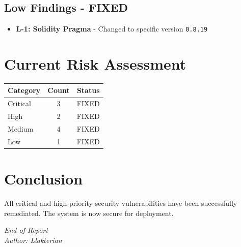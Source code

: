 \documentclass[12pt,a4paper]{article}
\begin{document}
\subsection{Low Findings - FIXED}

\begin{itemize}
\item \textbf{L-1: Solidity Pragma} - Changed to specific version \texttt{0.8.19}
\end{itemize}

\section{Current Risk Assessment}

\begin{tabular}{|l|c|c|}
\hline
Category & Count & Status \\
\hline
Critical & 3 & FIXED \\
\hline
High & 2 & FIXED \\
\hline
Medium & 4 & FIXED \\
\hline
Low & 1 & FIXED \\
\hline
\end{tabular}

\vspace{0.5in}
\noindent{}

\section{Conclusion}

All critical and high-priority security vulnerabilities have been successfully remediated. The system is now secure for deployment.

\vspace{1in}
\noindent\begin{center}
\textit{End of Report} \\
\textit{Author: Llakterian}
\end{center}
\end{document}
